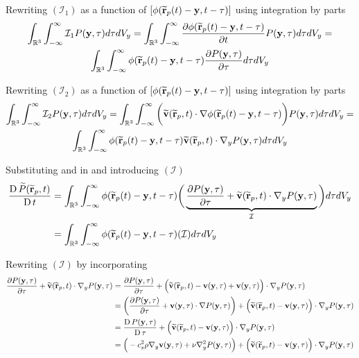Rewriting $(\mathcal{I}_1)$ as a function of $[\phi (\widetilde{\mathbf{r}}_p(t)-\mathbf{y}, t-\tau)]$ using integration by parts
\begin{multline}
    \IntRThreeAndT \mathcal{I}_1 \PY \IntD = \IntRThreeAndT \PartialDerivative{\PhiRY} \PY \IntD =\\ \IntRThreeAndT \PhiRY \PartialDerivative[\tau]{\PY} \IntD
    \label{eq:i1-phi}
\end{multline}

Rewriting $(\mathcal{I}_2)$ as a function of $[\phi (\widetilde{\mathbf{r}}_p(t)-\mathbf{y}, t-\tau)]$ using integration by parts
\begin{multline}
    \IntRThreeAndT \mathcal{I}_2 \PY \IntD = \IntRThreeAndT \bigg(\TildeVArgRp \cdot \nabla \PhiRY \bigg) \PY \IntD =\\ \IntRThreeAndT \PhiRY \TildeVArgRp \cdot  \nabla_y \PY \IntD
    \label{eq:i2-phi}
\end{multline}

Substituting  and  in  and introducing $(\mathcal{I})$
\begin{equation}
    \begin{split}
        \LagDerivative{\TilePArgRp} & = \IntRThreeAndT \PhiRY \bigg( \underbrace{\PartialDerivative[\tau]{\PY} + \TildeVArgRp \cdot \nabla_y \PY}_{\mathcal{I}} \bigg) \IntD \\
        & = \IntRThreeAndT \PhiRY (\mathcal{I}) \IntD
    \end{split}
    \label{eq:phi-simplified-P-eq}
\end{equation}


Rewriting $(\mathcal{I})$ by incorporating 
\begin{equation}
    \begin{split}
        \PartialDerivative[\tau]{\PY} + \TildeVArgRp \cdot \nabla_y \PY & = \PartialDerivative[\tau]{\PY} + \Big(\TildeVArgRp - \VY + \VY \Big) \cdot \nabla_y \PY \\
        & = \bigg(\PartialDerivative[\tau]{\PY} + \VY \cdot \nabla \PY \bigg) + \Big(\TildeVArgRp - \VY \Big) \cdot \nabla_y \PY \\
        & = \LagDerivative[\tau]{\PY} + \Big(\TildeVArgRp - \VY \Big) \cdot \nabla_y \PY \\
        & = \Big(-c_s^2 \rho \nabla_y \VY + \nu \nabla^2_y \PY   \Big) + \Big(\TildeVArgRp - \VY \Big) \cdot \nabla_y \PY
    \end{split}
    \label{eq:simplified-integrand}
\end{equation}

